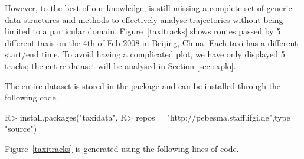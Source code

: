 \documentclass[article]{jss}
\begin{document}
However, to the best of our knowledge,  is still missing a complete set of generic data structures and methods to effectively analyse trajectories without being limited to a particular domain. Figure~\ref{taxitracks} shows routes passed by 5 different taxis on the 4th of Feb 2008 in Beijing, China. Each taxi has a different start/end time. To avoid having a complicated plot, we have only displayed 5 tracks; the entire dataset will be analysed in Section \ref{sec:explo}.

The entire dataset is stored in the  package    and can be installed through the following code.
\begin{Sinput}
R>   install.packages("taxidata", 
R>   repos = "http://pebesma.staff.ifgi.de",type = "source") 
\end{Sinput}

Figure~\ref{taxitracks} is generated using the following lines of code.
\end{document}
